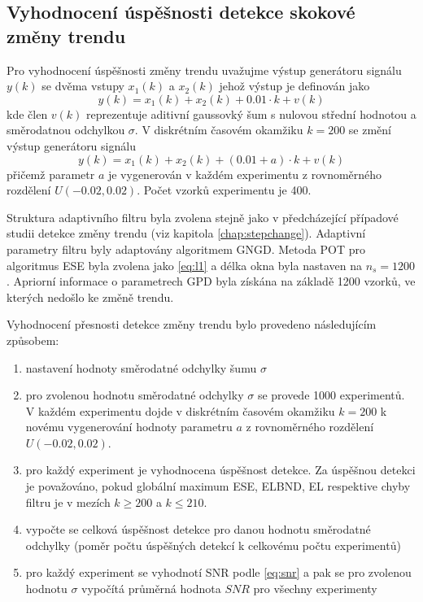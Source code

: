 \subsection{Vyhodnocení úspěšnosti detekce skokové změny trendu}\label{chap:trendchange_evaluation}
Pro vyhodnocení úspěšnosti změny trendu uvažujme výstup generátoru signálu $y(k)$ se dvěma vstupy $x_1(k)$ a $x_2(k)$ jehož výstup je definován jako
\begin{equation}\label{eq:trnd_stats}
    y(k) = x_1(k) + x_2(k) + 0.01 \cdot k + v(k)
\end{equation}
kde člen $v(k)$ reprezentuje aditivní gaussovký šum s nulovou střední hodnotou a směrodatnou odchylkou $\sigma$. V diskrétním časovém okamžiku $k=200$ se změní výstup generátoru signálu
\begin{equation}
    y(k) = x_1(k) + x_2(k) + (0.01 + a) \cdot k + v(k)
\end{equation}
přičemž parametr $a$ je vygenerován v každém experimentu z rovnoměrného rozdělení $U(-0.02,0.02)$. Počet vzorků experimentu je 400.
\par 
Struktura adaptivního filtru byla zvolena stejně jako v předcházející případové studii detekce změny trendu (viz kapitola \ref{chap:stepchange}). Adaptivní parametry filtru byly adaptovány algoritmem GNGD. Metoda POT pro algoritmus ESE byla zvolena jako \ref{eq:l1} a délka okna byla nastaven na $n_s=1200$. Apriorní informace o parametrech GPD byla získána na základě 1200 vzorků, ve kterých nedošlo ke změně trendu. 
\par 
Vyhodnocení přesnosti detekce změny trendu bylo provedeno následujícím způsobem:
\begin{enumerate}
\item nastavení hodnoty směrodatné odchylky šumu $\sigma$
\item pro zvolenou hodnotu směrodatné odchylky $\sigma$ se provede 1000 experimentů. V každém experimentu dojde v diskrétním časovém okamžiku $k=200$ k  novému vygenerování hodnoty parametru $a$ z rovnoměrného rozdělení $U(-0.02,0.02)$.
\item pro každý experiment je vyhodnocena úspěšnost detekce. Za úspěšnou detekci je považováno, pokud globální maximum ESE, ELBND, EL respektive chyby filtru je v mezích $k\geq 200$ a $k\leq 210$. 
\item vypočte se celková úspěšnost detekce pro danou hodnotu směrodatné odchylky (poměr počtu úspěšných detekcí k celkovému počtu experimentů)
\item pro každý experiment se vyhodnotí SNR podle \ref{eq:snr} a pak se pro zvolenou hodnotu $\sigma$ vypočítá průměrná hodnota $SNR$ pro všechny experimenty
\end{enumerate}

